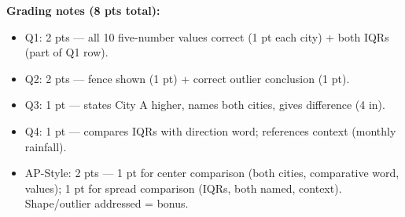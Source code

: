 \documentclass[10pt]{article}
\begin{document}
\begin{teachernote}
\textbf{Grading notes (8 pts total):}
\begin{itemize}[itemsep=2pt]
  \item Q1: 2 pts --- all 10 five-number values correct (1 pt each city) + both IQRs (part of Q1 row).
  \item Q2: 2 pts --- fence shown (1 pt) + correct outlier conclusion (1 pt).
  \item Q3: 1 pt --- states City A higher, names both cities, gives difference (4 in).
  \item Q4: 1 pt --- compares IQRs with direction word; references context (monthly rainfall).
  \item AP-Style: 2 pts --- 1 pt for center comparison (both cities, comparative word, values);
        1 pt for spread comparison (IQRs, both named, context). Shape/outlier addressed = bonus.
\end{itemize}
\end{teachernote}
\end{document}
